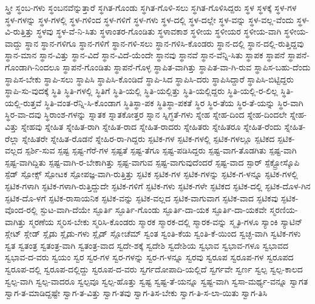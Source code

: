 {ಸ್ತ್ರೀ
ಸ್ಥಂಬ-ಗಳು
ಸ್ಥಂಬನವೆನ್ನುತ್ತಾರೆ
ಸ್ಥಗಿತ-ಗೊಂಡು
ಸ್ಥಗಿತ-ಗೊಳಿ-ಸಲು
ಸ್ಥಗಿತ-ಗೊಳಿಸಿದ್ದರು
ಸ್ಥಳ
ಸ್ಥಳಕ್ಕೆ
ಸ್ಥಳ-ಗಳ
ಸ್ಥಳ-ಗಳನ್ನು
ಸ್ಥಳ-ಗಳಲ್ಲಿ
ಸ್ಥಳ-ಗಳಿಂದ
ಸ್ಥಳ-ಗಳಿಗೆ
ಸ್ಥಳ-ಗಳು
ಸ್ಥಳ-ದಲ್ಲಿ
ಸ್ಥಳ-ದಲ್ಲೇ
ಸ್ಥಳ-ವನ್ನು
ಸ್ಥಳ-ವಲ್ಲ-ವೆಂದು
ಸ್ಥಳ-ವಿ-ರುತ್ತಿತ್ತು
ಸ್ಥಳವು
ಸ್ಥಳ-ವೆ-ನಿ-ಸಿತು
ಸ್ಥಳಾಂತರ-ಗೊಂಡಿತು
ಸ್ಥಳಾವಕಾಶ
ಸ್ಥಳೀಯ
ಸ್ಥಳೀಯರ
ಸ್ಥಳೀಯ-ವಾಗಿ
ಸ್ಥಳೀಯ-ವಾದ್ದು
ಸ್ಥಾನ
ಸ್ಥಾನ-ಗಳಿಗೂ
ಸ್ಥಾನ-ಗಳಿಗೆ
ಸ್ಥಾನ-ಗಳಿ-ಸಲು
ಸ್ಥಾನ-ಗಳಿಸಿ-ಕೊಂಡರು
ಸ್ಥಾನ-ದಲ್ಲಿ
ಸ್ಥಾನ-ದಲ್ಲಿ-ರುತ್ತಿದ್ದವು
ಸ್ಥಾನ-ಮಾನ
ಸ್ಥಾನ-ವಿತ್ತು
ಸ್ಥಾನ-ವಿದೆ
ಸ್ಥಾನ-ವಿದೆ-ಯೆಂದೇ
ಸ್ಥಾನವು
ಸ್ಥಾನವೆ
ಸ್ಥಾನ-ವೆನ್ನಿ-ಸಿತು
ಸ್ಥಾಪಕ
ಸ್ಥಾಪನೆ
ಸ್ಥಾಪನೆ-ಗೊಂಡಾಗಿ-ನಿಂದಲೂ
ಸ್ಥಾಪನೆ-ಗೊಂಡಿತು
ಸ್ಥಾಪನೆ-ಗೊಳ್ಳ
ಸ್ಥಾಪಿತ-ವಾಗಿತ್ತು
ಸ್ಥಾಪಿತ-ವಾ-ಗಿ-ರುವ
ಸ್ಥಾಪಿಸ-ಬಹು-ದೆಂದು
ಸ್ಥಾಪಿಸ-ಬೇಕು
ಸ್ಥಾಪಿ-ಸಲು
ಸ್ಥಾಪಿಸಿ
ಸ್ಥಾಪಿಸಿ-ಕೊಂಡಿದೆ
ಸ್ಥಾಪಿ-ಸಿದ
ಸ್ಥಾಪಿಸಿ-ದರು
ಸ್ಥಾಪಿಸಿದ್ದಾರೆ
ಸ್ಥಾಪಿಸಿ-ಬಿಟ್ಟಿದ್ದರು
ಸ್ಥಾಪಿ-ಸು-ವುದಕ್ಕೆ
ಸ್ಥಿತಿ
ಸ್ಥಿತಿ-ಗಳಲ್ಲಿ
ಸ್ಥಿತಿಗೆ
ಸ್ಥಿತಿ-ಯಲ್ಲಿ
ಸ್ಥಿತಿ-ಯಲ್ಲಿತ್ತು
ಸ್ಥಿತಿ-ಯಲ್ಲಿದ್ದರು
ಸ್ಥಿತಿ-ಯಲ್ಲಿ-ರ-ಲಿಲ್ಲ
ಸ್ಥಿತಿ-ಯಲ್ಲಿ-ರುತ್ತವೆ
ಸ್ಥಿತಿ-ವಂತ-ರೆನ್ನಿ-ಸಿ-ಕೊಂಡಾಗ
ಸ್ಥಿತಿಸ್ಥಾ-ಪಕ
ಸ್ಥಿತಿಸ್ಥಾ-ಪಕತೆ
ಸ್ಥಿರ
ಸ್ಥಿರ-ತೆಯ
ಸ್ಥಿರ-ತೆ-ಯನ್ನು
ಸ್ಥಿರ-ವಾಗಿ
ಸ್ಥಿರ-ವಾ-ದವು
ಸ್ಥಿರಾಂಶ-ಗಳನ್ನು
ಸ್ನಾತಕ
ಸ್ನಾತಕೋತ್ತರ
ಸ್ನಾನ
ಸ್ನಿಗ್ಧತೆ-ಗಳು
ಸ್ನೇಹ
ಸ್ನೇಹ-ದಿಂದ
ಸ್ನೇಹ-ದಿಂದಲೇ
ಸ್ನೇಹ-ವಿತ್ತು
ಸ್ನೇಹವು
ಸ್ನೇಹಿತ
ಸ್ನೇಹಿತ-ರಾಗಿ
ಸ್ನೇಹಿತ-ರಾದ
ಸ್ನೇಹಿತ-ರಾದರು
ಸ್ನೇಹಿತರು
ಸ್ನೇಹಿತರೂ
ಸ್ನೇಹಿತ-ರೆಂದು
ಸ್ನೇಹಿತ-ರೆಲ್ಲಾ
ಸ್ನೇಹಿತರೇ
ಸ್ನೇಹಿತ-ರೊಡನೆ
ಸ್ನೇಹಿರ-ರಾ-ಗಿದ್ದರು
ಸ್ಪಟಿಕ-ಗಳ
ಸ್ಪಟಿಕ-ಗಳಲ್ಲಿ
ಸ್ಪಟಿಕ-ಗಳಲ್ಲೂ
ಸ್ಪಟಿಕದ
ಸ್ಪಟಿಕ-ವಲ್ಲದ
ಸ್ಪರ್ಶಿ-ಸುವ
ಸ್ಪಷ್ಟ
ಸ್ಪಷ್ಟ-ಗೆರೆ-ಗಳ
ಸ್ಪಷ್ಟತೆ
ಸ್ಪಷ್ಟ-ತೆಗೂ
ಸ್ಪಷ್ಟ-ಪಡಿಸಿದ್ದರು
ಸ್ಪಷ್ಟ-ವಾಗ-ತೊಡಗಿತು
ಸ್ಪಷ್ಟ-ವಾಗಿ
ಸ್ಪಷ್ಟ-ವಾಗಿದ್ದಿತು
ಸ್ಪಷ್ಟ-ವಾಗಿ-ರ-ಬೇಕಾಗಿತ್ತು
ಸ್ಪಷ್ಟ-ವಾಗುವ
ಸ್ಪಷ್ಟ-ವಾಗುವುದೆಂದರೆ
ಸ್ಪಷ್ಟ-ವಾದ
ಸ್ಪಾರ್
ಸ್ಪೆಕ್ಟ್ರೋಸ್ಕೊಪಿ
ಸ್ಪೆಡ್
ಸ್ಪೋಕ್ಸ್
ಸ್ಪೋಟಕ
ಸ್ಪೋಪಜ್ಞ-ವಾಗಿ-ರುತ್ತಿತ್ತು
ಸ್ಫಟಿಕ
ಸ್ಫಟಿಕ-ಗಳ
ಸ್ಫಟಿಕ-ಗಳನ್ನು
ಸ್ಫಟಿಕ-ಗ-ಳನ್ನೂ
ಸ್ಫಟಿಕ-ಗಳಲ್ಲಿ
ಸ್ಫಟಿಕ-ಗಳಾಗಿ
ಸ್ಫಟಿಕ-ಗಳಾಗಿ-ರುತ್ತಿದ್ದುದೇ
ಸ್ಫಟಿಕ-ಗಳಿಗೆ
ಸ್ಫಟಿಕ-ಗಳು
ಸ್ಫಟಿಕ-ಗಳೇ
ಸ್ಫಟಿಕದ
ಸ್ಫಟಿಕ-ದಲ್ಲಿ
ಸ್ಫಟಿಕ-ದೊಳ-ಗಿನ
ಸ್ಫಟಿಕ-ದೊ-ಳಗೆ
ಸ್ಫಟಿಕ-ರಾಸಾಯನಿಕ
ಸ್ಫಟಿಕ-ವನ್ನು
ಸ್ಫಟಿಕ-ವಲ್ಲದ
ಸ್ಫಟಿಕ-ವಾಗುವಾಗ
ಸ್ಫಟಿಕ-ವಾದ
ಸ್ಫಟಿಕವು
ಸ್ಫಟಿಕ-ವೊಂದ-ರಲ್ಲಿ
ಸ್ಫುಟ-ವಾಗಿ-ದೆಯೇ
ಸ್ಫೂರ್ತಿ
ಸ್ಫೂರ್ತಿ-ಗೊಂಡು
ಸ್ಫೂರ್ತಿ-ದಾ-ಯಕ
ಸ್ಫೂರ್ತಿ-ದಾ-ಯಕವೇ
ಸ್ಮರಣಿಯ-ವಾಗಿತ್ತು
ಸ್ಮರಣೆಯ
ಸ್ಮರಿಸ-ಬೇಕು
ಸ್ಮರಿಸಿ-ಕೊಂಡರು
ಸ್ಮಾರಕ
ಸ್ಮಾರಕ-ದಲ್ಲಿ
ಸ್ಮಾರಕ-ವನ್ನು
ಸ್ಮೃತಿ-ಗಳೂ
ಸ್ಯಾಂಕಿ
ಸ್ಯಾಟಿನ್
ಸ್ಲೇಟ್
ಸ್ಲೇಡ್
ಸ್ಲೈಡು
ಸ್ಲೈಡು-ಗಳು
ಸ್ಲೈಡ್
ಸ್ಲೋಚೆಮ್
ಸ್ವಂತ
ಸ್ವಂತಿ-ಕೆಯ
ಸ್ವಂತಿ-ಕೆ-ಯಿಂದ
ಸ್ವಚ್ಛ-ವಾಗಿ
ಸ್ವಟಿಕ-ಗಳು
ಸ್ವತ
ಸ್ವತಂತ್ರ
ಸ್ವತಂತ್ರ-ವಾಗಿ
ಸ್ವತಂತ್ರ-ವಾದ
ಸ್ವದೇ-ಶಕ್ಕೆ
ಸ್ವದೇಶಿ
ಸ್ವದೇಶಿಯ
ಸ್ವಭಾವ
ಸ್ವಭಾವ-ಗಳೂ
ಸ್ವಭಾವದ
ಸ್ವಭಾವ-ದ-ವರು
ಸ್ವಯಂ
ಸ್ವರ
ಸ್ವರ-ಗಳ
ಸ್ವರ-ಗಳನ್ನು
ಸ್ವರ-ಗ-ಳನ್ನೂ
ಸ್ವರವು
ಸ್ವರೂಪ
ಸ್ವರೂಪ-ಗಳ
ಸ್ವರೂಪದ
ಸ್ವರೂಪ-ದಲ್ಲಿ
ಸ್ವರೂಪ-ದಲ್ಲಿದ್ದು
ಸ್ವರೂಪ-ದ-ವರು
ಸ್ವರ್ಗದೋಪಾದಿ-ಯಲ್ಲಿದೆ
ಸ್ವರ್ಗವೇ
ಸ್ವರ್ಣ
ಸ್ವಲ್ಪ
ಸ್ವಲ್ಪ-ಕಾಲದ
ಸ್ವಲ್ಪ-ವಾಗಿ
ಸ್ವಲ್ಪ-ವಾದರೂ
ಸ್ವಲ್ಪವೂ
ಸ್ವಲ್ಪ-ಹೊತ್ತು
ಸ್ವಷ್ಟ
ಸ್ವಷ್ಟ-ತೆ-ಯನ್ನೂ
ಸ್ವಷ್ಟ-ವಾಗಿ
ಸ್ವಸಾ-ಮರ್ಥ್ಯ-ವನ್ನೂ
ಸ್ವಾಗತ
ಸ್ವಾಗ-ತ-ಮಾಡಿದ್ದಷ್ಟೇ
ಸ್ವಾಗ-ತ-ವಿತ್ತು
ಸ್ವಾಗ-ತವು
ಸ್ವಾಗ-ತಿಸ-ಬೇಕು
ಸ್ವಾಗ-ತಿ-ಸ-ಲಾ-ಯಿತು
ಸ್ವಾಗ-ತಿಸಿ
}
